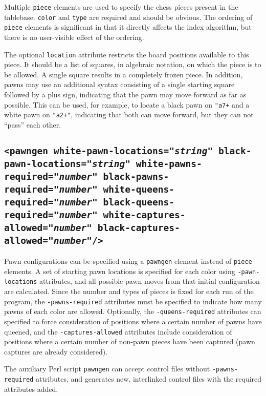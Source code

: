 \documentclass[11pt]{article}
\begin{document}
Multiple {\tt piece} elements are used to specify the chess pieces
present in the tablebase. {\tt color} and {\tt type} are required and
should be obvious.  The ordering of {\tt piece} elements is
significant in that it directly affects the index algorithm,
but there is no user-visible effect of the ordering.

The optional {\tt location} attribute restricts the board positions
available to this piece.  It should be a list of squares, in algebraic
notation, on which the piece is to be allowed.  A single square
results in a completely frozen piece.  In addition, pawns may use an
additional syntax consisting of a single starting square followed by a
plus sign, indicating that the pawn may move forward as far as
possible.  This can be used, for example, to locate a black pawn on
{\tt "a7+} and a white pawn on {\tt "a2+"}, indicating that both can
move forward, but they can not ``pass'' each other.

\subsection{\tt <pawngen white-pawn-locations="{\it string}" black-pawn-locations="{\it string}" \hfil\break\hbox{\qquad} white-pawns-required="{\it number}" black-pawns-required="{\it number}" \hfil\break\hbox{\qquad} white-queens-required="{\it number}" black-queens-required="{\it number}" \hfil\break\hbox{\qquad} white-captures-allowed="{\it number}" black-captures-allowed="{\it number}"/>}

Pawn configurations can be specified using a {\tt pawngen} element
instead of {\tt piece} elements.  A set of starting pawn locations is
specified for each color using {\tt *-pawn-locations} attributes, and
all possible pawn moves from that initial configuration are
calculated.  Since the number and types of pieces is fixed for each
run of the program, the {\tt *-pawns-required} attributes must be
specified to indicate how many pawns of each color are allowed.
Optionally, the {\tt *-queens-required} attributes can specified to
force consideration of positions where a certain number of pawns have
queened, and the {\tt *-captures-allowed} attributes include
consideration of positions where a certain number of non-pawn pieces
have been captured (pawn captures are already considered).

The auxiliary Perl script {\tt pawngen} can accept control files
without {\tt *-pawns-required} attributes, and generates new,
interlinked control files with the required attributes added.
\end{document}
